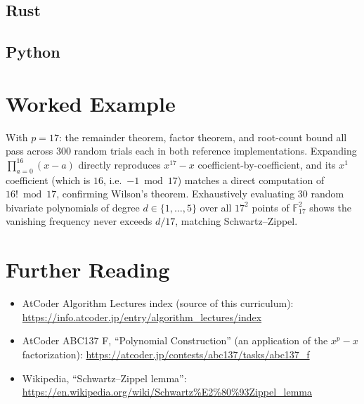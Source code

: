 \documentclass[11pt]{article}
\begin{document}
\codenote
\subsection{Rust}

\subsection{Python}

\section{Worked Example}
\begin{examplebox}
With $p=17$: the remainder theorem, factor theorem, and root-count bound
all pass across 300 random trials each in both reference implementations.
Expanding $\prod_{a=0}^{16}(x-a)$ directly reproduces $x^{17}-x$
coefficient-by-coefficient, and its $x^1$ coefficient (which is $16$,
i.e.\ $-1 \bmod 17$) matches a direct computation of $16! \bmod 17$,
confirming Wilson's theorem. Exhaustively evaluating 30 random bivariate
polynomials of degree $d \in \{1,\ldots,5\}$ over all $17^2$ points of
$\mathbb{F}_{17}^2$ shows the vanishing frequency never exceeds $d/17$,
matching Schwartz--Zippel.
\end{examplebox}

\section{Further Reading}
\begin{itemize}[leftmargin=1.5em]
  \item AtCoder Algorithm Lectures index (source of this curriculum):
        \url{https://info.atcoder.jp/entry/algorithm_lectures/index}
  \item AtCoder ABC137 F, ``Polynomial Construction'' (an application of
        the $x^p-x$ factorization):
        \url{https://atcoder.jp/contests/abc137/tasks/abc137_f}
  \item Wikipedia, ``Schwartz--Zippel lemma'':
        \url{https://en.wikipedia.org/wiki/Schwartz\%E2\%80\%93Zippel_lemma}
\end{itemize}
\end{document}
